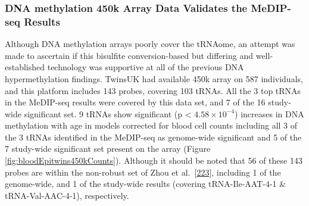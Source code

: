 \documentclass[
]{book}
\begin{document}
\hypertarget{dna-methylation-450k-array-data-validates-the-medip-seq-results}{%
\subsubsection{DNA methylation 450k Array Data Validates the MeDIP-seq Results}\label{dna-methylation-450k-array-data-validates-the-medip-seq-results}}

Although DNA methylation arrays poorly cover the tRNAome, an attempt was made to ascertain if this bisulfite conversion-based but differing and well-established technology was supportive at all of the previous DNA hypermethylation findings.
TwinsUK had available 450k array on 587 individuals, and this platform includes 143 probes, covering 103 tRNAs.
All the 3 top tRNAs in the MeDIP-seq results were covered by this data set, and 7 of the 16 study-wide significant set.
9 tRNAs show significant (p \textless{} \(4.58\times10^{-4}\)) increases in DNA methylation with age in models corrected for blood cell counts including all 3 of the 3 tRNAs identified in the MeDIP-seq as genome-wide significant and 5 of the 7 study-wide significant set present on the array (Figure \ref{fig:bloodEpitwins450kCounts}).
Although it should be noted that 56 of these 143 probes are within the non-robust set of Zhou et al.~{[}\protect\hyperlink{ref-Zhou2017}{223}{]}, including 1 of the genome-wide, and 1 of the study-wide results (covering tRNA-Ile-AAT-4-1 \& tRNA-Val-AAC-4-1), respectively.
\end{document}
